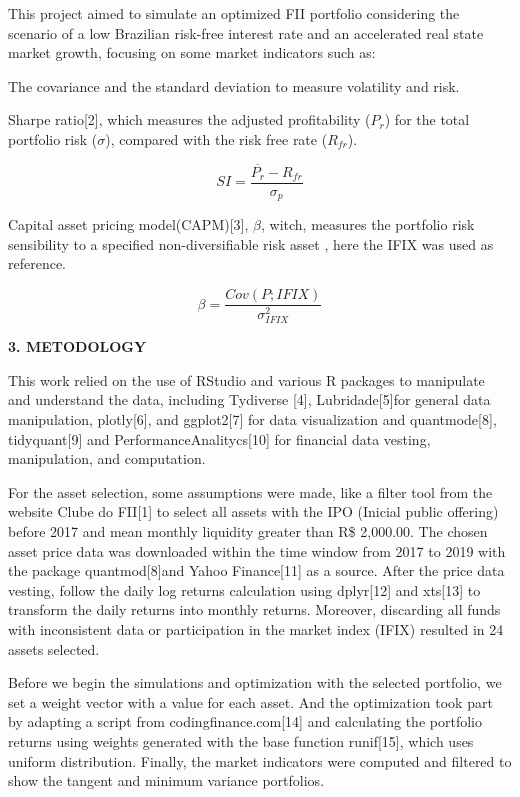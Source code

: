 \documentclass[
]{article}
\begin{document}
This project aimed to simulate an optimized FII portfolio considering
the scenario of a low Brazilian risk-free interest rate and an
accelerated real state market growth, focusing on some market indicators
such as:

The covariance and the standard deviation to measure volatility and
risk.

Sharpe ratio{[}2{]}, which measures the adjusted profitability (\(P_r\))
for the total portfolio risk (\(\sigma\)), compared with the risk free
rate (\(R_{fr}\)).

\[ SI=\frac{\overline{P_r}-R_{fr}}{\sigma_{p}} \]

Capital asset pricing model(CAPM){[}3{]}, \(\beta\), witch, measures the
portfolio risk sensibility to a specified non-diversifiable risk asset ,
here the IFIX was used as reference.

\[\beta=\frac{Cov(P;IFIX)}{\sigma_{IFIX}^2}\]

\begin{center}
\textbf{3. METODOLOGY}
\end{center}

This work relied on the use of RStudio and various R packages to
manipulate and understand the data, including Tydiverse {[}4{]},
Lubridade{[}5{]}for general data manipulation, plotly{[}6{]}, and
ggplot2{[}7{]} for data visualization and quantmode{[}8{]},
tidyquant{[}9{]} and PerformanceAnalitycs{[}10{]} for financial data
vesting, manipulation, and computation.

For the asset selection, some assumptions were made, like a filter tool
from the website Clube do FII{[}1{]} to select all assets with the IPO
(Inicial public offering) before 2017 and mean monthly liquidity greater
than R\$ 2,000.00. The chosen asset price data was downloaded within the
time window from 2017 to 2019 with the package quantmod{[}8{]}and Yahoo
Finance{[}11{]} as a source. After the price data vesting, follow the
daily log returns calculation using dplyr{[}12{]} and xts{[}13{]} to
transform the daily returns into monthly returns. Moreover, discarding
all funds with inconsistent data or participation in the market index
(IFIX) resulted in 24 assets selected.

Before we begin the simulations and optimization with the selected
portfolio, we set a weight vector with a value for each asset. And the
optimization took part by adapting a script from
codingfinance.com{[}14{]} and calculating the portfolio returns using
weights generated with the base function runif{[}15{]}, which uses
uniform distribution. Finally, the market indicators were computed and
filtered to show the tangent and minimum variance portfolios.
\end{document}
